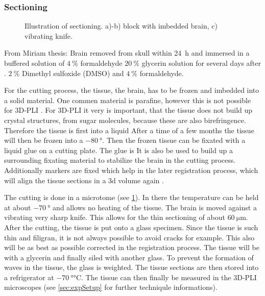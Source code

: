 \subsubsection{Sectioning}
%
\begin{figure}[!t]
	\centering
    \setlength{\tikzwidth}{0.75\textwidth}
	\caption{Illustration of sectioning. a)-b) block with imbedded brain, c) vibrating knife.}
	\label{fig:brain_sectioning}
\end{figure}
%
From Miriam thesis:
Brain removed from skull within \SI{24}{\hour} and immersed in a buffered solution of $\SI{4}{\percent}$ formaldehyde
$\SI{20}{\percent}$ glycerin solution for several days after \dummy{}.
$\SI{2}{\percent}$ Dimethyl sulfoxide (DMSO) and $\SI{4}{\percent}$ formaldehyde.
\par
% 
For the cutting process, the tissue, \ie{} the brain, has to be frozen and imbedded into a solid material.
One commen material is parafine, however this is not possible for \ac{3D-PLI} .
For \ac{3D-PLI} it very is important, that the tissue does not build up crystal structures, \eg{} from sugar molecules, because these are also birefringence.
Therefore the tissue is first \dummy{} into a \dummy{} liquid \dummy{}
After a time of a few months the tissue will then be frozen into a $\SI{-80}{\degree}$.
Then the frozen tissue can be fixated with a liquid glue on a cutting plate.
The glue is \dummy{}
It is also be used to build up a surrounding fixating material to stabilize the brain in the cutting process.
Additionally markers are fixed which help in the later registration process, which will align the tissue sections in a 3d volume again \cite{Schober2016,Ali2018,Schmitz2018}.
\par
%
The cutting is done in a microtome (see \cref{fig:brain_sectioning}).
In there the temperature can be held at about $\SI{-70}{\degree}$ and allows no heating of the tissue.
The brain is moved against a vibrating very sharp knife.
This allows for the thin sectioning of about $\SI{60}{\micro\meter}$.
After the cutting, the tissue is put onto a glass specimen.
Since the tissue is such thin and filigran, it is not always possible to avoid cracks for example.
This also will be as best as possible corrected in the registration process.
The tissue will be \dummy{} with a glycerin \dummy{} and finally siled with another glass.
To prevent the formation of waves in the tissue, the glass is weighted.
The tissue sections are then stored into a refrigerator at $\SI{-70}{\degree\celsius}$.
The tissue can then finally be measured in the \ac{3D-PLI} microscopes (see \cref{sec:expSetup} for further techniqule informations).
%
%
